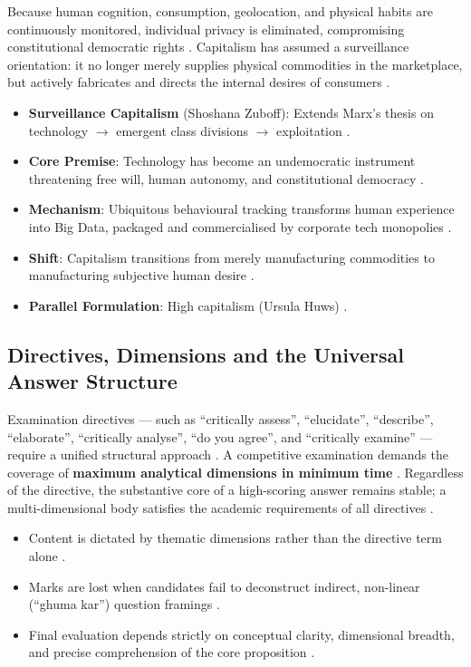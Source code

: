 Because human cognition, consumption, geolocation, and physical habits are continuously monitored, individual privacy is eliminated, compromising constitutional democratic rights . Capitalism has assumed a surveillance orientation: it no longer merely supplies physical commodities in the marketplace, but actively fabricates and directs the internal desires of consumers .

\begin{QuickRevision}
\begin{itemize}
    \item \textbf{Surveillance Capitalism} (Shoshana Zuboff): Extends Marx's thesis on technology $\rightarrow$ emergent class divisions $\rightarrow$ exploitation .
    \item \textbf{Core Premise}: Technology has become an undemocratic instrument threatening free will, human autonomy, and constitutional democracy .
    \item \textbf{Mechanism}: Ubiquitous behavioural tracking transforms human experience into Big Data, packaged and commercialised by corporate tech monopolies .
    \item \textbf{Shift}: Capitalism transitions from merely manufacturing commodities to manufacturing subjective human desire .
    \item \textbf{Parallel Formulation}: High capitalism (Ursula Huws) .
\end{itemize}
\end{QuickRevision}

\subsection{Directives, Dimensions and the Universal Answer Structure}

Examination directives --- such as ``critically assess'', ``elucidate'', ``describe'', ``elaborate'', ``critically analyse'', ``do you agree'', and ``critically examine'' --- require a unified structural approach . A competitive examination demands the coverage of \textbf{maximum analytical dimensions in minimum time} . Regardless of the directive, the substantive core of a high-scoring answer remains stable; a multi-dimensional body satisfies the academic requirements of all directives .

\begin{CriticalPoint}
\begin{itemize}
    \item Content is dictated by thematic dimensions rather than the directive term alone .
    \item Marks are lost when candidates fail to deconstruct indirect, non-linear (``ghuma kar'') question framings .
    \item Final evaluation depends strictly on conceptual clarity, dimensional breadth, and precise comprehension of the core proposition .
\end{itemize}
\end{CriticalPoint}

